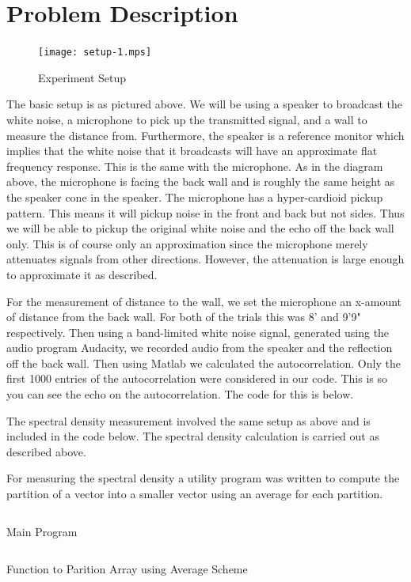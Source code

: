 \documentclass{article}
\begin{document}
      \section{Problem Description}
      \begin{figure}[H]
         \texttt{[image: setup-1.mps]}
         \caption{Experiment Setup}
      \end{figure}
      The basic setup is as pictured above. We will be using a speaker to
      broadcast the white noise, a microphone to pick up the transmitted signal,
      and a wall to measure the distance from. Furthermore, the speaker is
      a reference monitor which implies that the white noise that it broadcasts
      will have an approximate flat frequency
      response. This is the same with the microphone.
      As in the diagram above, the microphone is facing the back wall
      and is roughly the same height as the speaker cone in the speaker. The
      microphone has a hyper-cardioid pickup pattern. This means it will
      pickup noise in the front and back but not sides. Thus we will be
      able to pickup the original white noise and the echo off the back
      wall only. This is of course only an approximation since the microphone
      merely attenuates signals from other directions. However, the
      attenuation is large enough to approximate it as described.

      For the measurement of distance to the wall, we set the microphone
      an x-amount of distance from the back wall. For both of the trials this
      was 8' and 9'9" respectively. Then using a band-limited white noise
      signal, generated using the audio program Audacity, we recorded audio
      from the speaker and the reflection off the back wall. Then using Matlab
      we calculated the autocorrelation. Only the first 1000 entries of the
      autocorrelation were considered in our code. This is so you can see the
      echo on the autocorrelation.
      The code for this is below.

      The spectral density measurement involved the same setup as above
      and is included in the code below. The spectral density calculation
      is carried out as described above.

      For measuring the spectral density a
      utility program was written to compute the partition of a vector
      into a smaller vector using an average for each partition.

      \begin{listing}[H]
         \inputminted[linenos]{matlab}{../main.m}
         \caption{Main Program}
      \end{listing}
      \begin{listing}[H]
         \inputminted[linenos]{matlab}{../partition.m}
         \caption{Function to Parition Array using Average Scheme}
      \end{listing}
\end{document}
